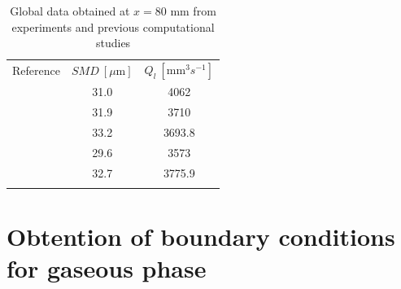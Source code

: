 \begin{table}[!h]
\centering
\caption{Global data obtained at $x = 80$ mm from experiments and previous computational studies }
\begin{tabular}{ccc}
\thickhline
Reference & $SMD~\left[ \mu \mathrm{m}\right]$  & $Q_l~\left[ \mathrm{mm}^3 s^{-1} \right]$ \\
\thickhline
{} & 31.0 &   4062  \\  
 & 31.9  & 3710  \\
 & 33.2 &  3693.8  \\
 & 29.6  & 3573  \\
 & 32.7  & 3775.9  \\
\thickhline
\end{tabular}
\label{tab:previous_numerical_studies_on_jicf_dlr_values}
\end{table}




\clearpage

\section{Obtention of boundary conditions for gaseous phase}
\label{sec:ch6_BC_gaseous_phase}

